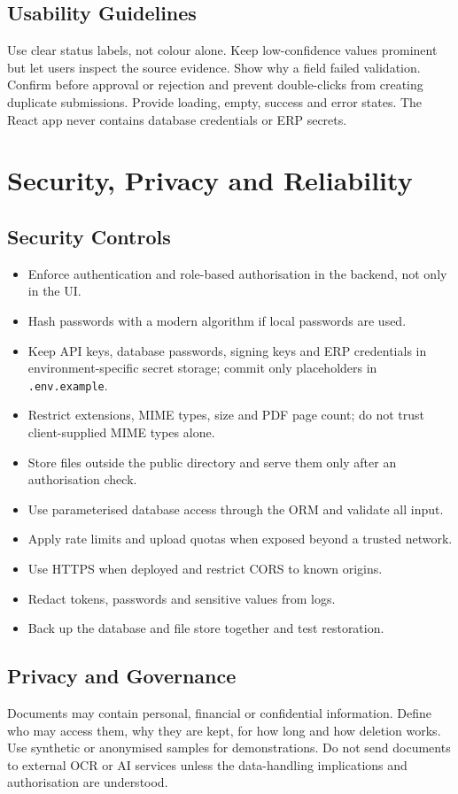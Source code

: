 \documentclass[11pt,a4paper]{report}
\begin{document}
\section{Usability Guidelines}
Use clear status labels, not colour alone. Keep low-confidence values prominent but let users inspect the source evidence. Show why a field failed validation. Confirm before approval or rejection and prevent double-clicks from creating duplicate submissions. Provide loading, empty, success and error states. The React app never contains database credentials or ERP secrets.

\chapter{Security, Privacy and Reliability}
\section{Security Controls}
\begin{itemize}
\item Enforce authentication and role-based authorisation in the backend, not only in the UI.
\item Hash passwords with a modern algorithm if local passwords are used.
\item Keep API keys, database passwords, signing keys and ERP credentials in environment-specific secret storage; commit only placeholders in \texttt{.env.example}.
\item Restrict extensions, MIME types, size and PDF page count; do not trust client-supplied MIME types alone.
\item Store files outside the public directory and serve them only after an authorisation check.
\item Use parameterised database access through the ORM and validate all input.
\item Apply rate limits and upload quotas when exposed beyond a trusted network.
\item Use HTTPS when deployed and restrict CORS to known origins.
\item Redact tokens, passwords and sensitive values from logs.
\item Back up the database and file store together and test restoration.
\end{itemize}

\section{Privacy and Governance}
Documents may contain personal, financial or confidential information. Define who may access them, why they are kept, for how long and how deletion works. Use synthetic or anonymised samples for demonstrations. Do not send documents to external OCR or AI services unless the data-handling implications and authorisation are understood.
\end{document}
